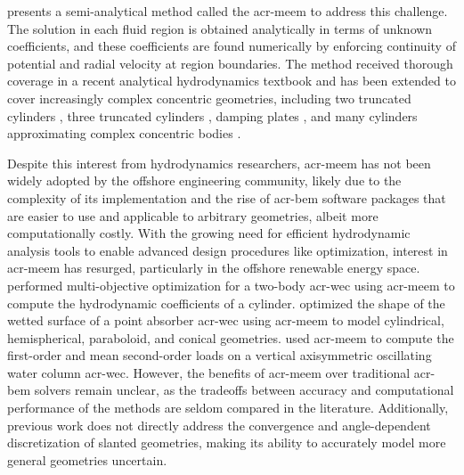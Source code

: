 \documentclass[ASNA,twocolumn]{USG} %
\begin{document}
\citet{yeung_added_1981} presents a semi-analytical method called the \acrfull{acr-meem} to address this challenge.
The solution in each fluid region is obtained analytically in terms of unknown coefficients, and these coefficients are found numerically by enforcing continuity of potential and radial velocity at region boundaries.
The method received thorough coverage in a recent analytical hydrodynamics textbook \citep{chatzigeorgiou2018analytical} and has been extended to cover increasingly complex concentric geometries, 
including two truncated cylinders \citep{mavrakos_hydrodynamic_2004,chau2012inertia}, three truncated cylinders \citep{zhang_performance_2024}, damping plates \citep{olaya_hydrodynamic_2015}, and many cylinders approximating complex concentric bodies \citep{kokkinowrachos_behaviour_1986}.

Despite this interest from hydrodynamics researchers, \gls{acr-meem} has not been widely adopted by the offshore engineering community, likely due to the complexity of its implementation 
and the rise of \gls{acr-bem} software packages that are easier to use and applicable to arbitrary geometries, albeit more computationally costly.
With the growing need for efficient hydrodynamic analysis tools to enable advanced design procedures like optimization, interest in \gls{acr-meem} has resurged, particularly in the offshore renewable energy space. 
\citet{pavlidou_novel_2022} performed multi-objective optimization for a two-body \gls{acr-wec} using \gls{acr-meem} to compute the hydrodynamic coefficients of a cylinder. 
\citet{zhang_hydrodynamic_2016} optimized the shape of the wetted surface of a point absorber \gls{acr-wec} using \gls{acr-meem} to model cylindrical, hemispherical, paraboloid, and conical geometries. 
\citet{mavrakos_hydrodynamic_2012} used \gls{acr-meem} to compute the first-order and mean second-order loads on a vertical axisymmetric oscillating water column \gls{acr-wec}. 
However, the benefits of \gls{acr-meem} over traditional \gls{acr-bem} solvers remain unclear, as the tradeoffs between accuracy and computational performance of the methods are seldom compared in the literature. 
Additionally, previous work does not directly address the convergence \behaviour{} and angle-dependent discretization of slanted geometries, making its ability to accurately model more general geometries uncertain.
\end{document}
